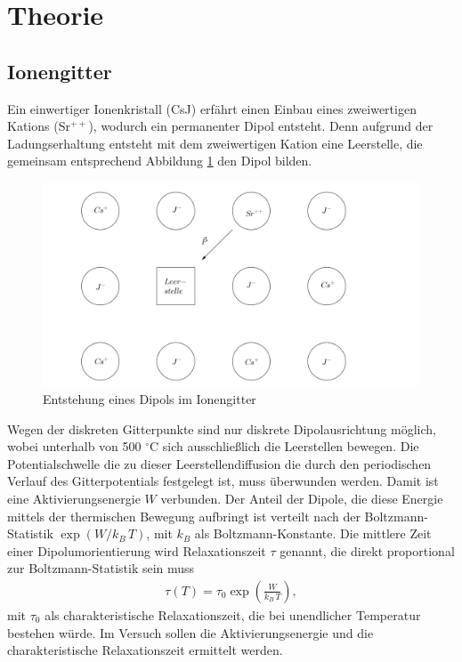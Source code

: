

\section{Theorie}
\setcounter{page}{1}
\subsection{Ionengitter}
Ein einwertiger Ionenkristall (CsJ) erfährt einen Einbau eines zweiwertigen Kations (Sr$^{++}$), wodurch ein permanenter Dipol entsteht. Denn aufgrund
der Ladungserhaltung entsteht mit dem zweiwertigen Kation eine Leerstelle, die gemeinsam entsprechend Abbildung \ref{pic_dipGitt} den Dipol bilden.
\begin{figure}[H]
\includegraphics[width=\textwidth]{../pics/dipGitt.png}
\caption{Entstehung eines Dipols im Ionengitter}
\label{pic_dipGitt}
\end{figure}
Wegen der diskreten Gitterpunkte sind nur diskrete Dipolausrichtung möglich, wobei unterhalb von 500 $^\circ$C sich ausschließlich die Leerstellen bewegen.
Die Potentialschwelle die zu dieser Leerstellendiffusion die durch den periodischen Verlauf des Gitterpotentials festgelegt ist, muss überwunden werden.
Damit ist eine Aktivierungsenergie $W$ verbunden. Der Anteil der Dipole, die diese Energie mittels der thermischen Bewegung aufbringt ist
verteilt nach der Boltzmann-Statistik $\exp(W/k_B\,T)$, mit $k_B$ als Boltzmann-Konstante. Die mittlere Zeit einer Dipolumorientierung wird Relaxationszeit
$\tau$ genannt, die direkt proportional zur Boltzmann-Statistik sein muss
\begin{align}
 \tau(T) = \tau_0 \exp\left(\frac{W}{k_B\, T}\right),
\end{align}
mit $\tau_0$ als charakteristische Relaxationszeit, die bei unendlicher Temperatur bestehen würde. Im Versuch sollen die Aktivierungsenergie und die
charakteristische Relaxationszeit ermittelt werden.


